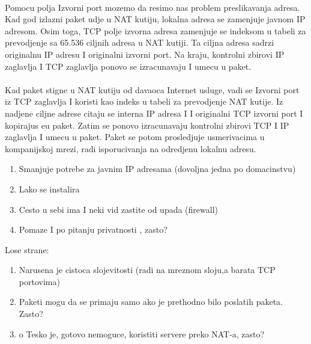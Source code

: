 \documentclass{article} %
\begin{document}
\\
Pomocu polja Izvorni port mozemo da resimo nas problem preslikavanja adresa. Kad god izlazni paket udje u NAT kutiju, lokalna adresa se zamenjuje javnom IP adresom. Osim toga, TCP polje izvorna adresa zamenjuje se indeksom  u tabeli za prevodjenje sa 65.536 ciljnih adresa u NAT kutiji. Ta ciljna adresa sadrzi originalnu IP adresu I originalni izvorni port. Na kraju, kontrolni zbirovi IP zaglavlja I TCP zaglavlja ponovo se izracunavaju I umecu u paket. \\
\\
Kad paket stigne u NAT kutiju od davaoca Internet usluge, vadi se Izvorni port iz TCP zaglavlja I koristi kao indeks u tabeli za prevodjenje NAT kutije. Iz nadjene ciljne adrese citaju se interna IP adresa I I originalni TCP izvorni port I kopirajus eu paket. Zatim se ponovo izracunavaju kontrolni zbirovi TCP I IP zaglavlja I umecu u paket. Paket se potom prosledjuje usmerivacima u kompanijskoj mrezi, radi isporucivanja na odredjenu lokalnu adresu.
\begin{enumerate}
	\item Smanjuje potrebe za javnim IP adresama (dovoljna jedna po domacinstvu)
	\item Lako se instalira
	\item Cesto u sebi ima I neki vid zastite od upada (firewall)
	\item Pomaze I po pitanju privatnosti , zasto?
\end{enumerate}
Lose strane:

\begin{enumerate}
	\item Narusena je cistoca slojevitosti (radi na mreznom sloju,a barata TCP portovima)
	\item Paketi mogu da se primaju samo ako je prethodno bilo poslatih paketa. Zasto?
	\item o	Tesko je, gotovo nemoguce, koristiti servere preko NAT-a, zasto?
\end{enumerate}
\end{document}
